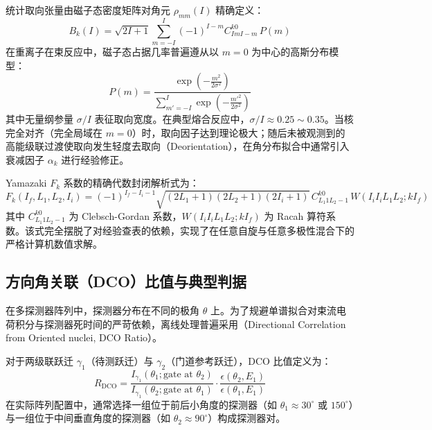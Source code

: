 统计取向张量由磁子态密度矩阵对角元 $\rho_{mm}(I)$ 精确定义：
\begin{equation}
    B_k(I) = \sqrt{2I+1} \sum_{m=-I}^I (-1)^{I-m} C_{I m I -m}^{k 0} \, P(m)
    \label{eq:orientation_tensor}
\end{equation}
在重离子在束反应中，磁子态占据几率普遍遵从以 $m=0$ 为中心的高斯分布模型：
\begin{equation}
    P(m) = \frac{\exp\left( -\frac{m^2}{2\sigma^2} \right)}{\sum_{m'=-I}^I \exp\left( -\frac{m'^2}{2\sigma^2} \right)}
    \label{eq:gaussian_substates}
\end{equation}
其中无量纲参量 $\sigma/I$ 表征取向宽度。在典型熔合反应中，$\sigma/I \approx 0.25 \sim 0.35$。当核完全对齐（完全局域在 $m=0$）时，取向因子达到理论极大；随后未被观测到的高能级联过渡使取向发生轻度去取向（Deorientation），在角分布拟合中通常引入衰减因子 $\alpha_k$ 进行经验修正。

Yamazaki $F_k$ 系数的精确代数封闭解析式为：
\begin{equation}
    F_k(I_f, L_1, L_2, I_i) = (-1)^{I_f - I_i - 1} \sqrt{(2L_1+1)(2L_2+1)(2I_i+1)} \, C_{L_1 1 L_2 -1}^{k 0} \, W(I_i I_i L_1 L_2; k I_f)
    \label{eq:yamazaki_formula}
\end{equation}
其中 $C_{L_1 1 L_2 -1}^{k 0}$ 为 Clebsch-Gordan 系数，$W(I_i I_i L_1 L_2; k I_f)$ 为 Racah 算符系数。该式完全摆脱了对经验查表的依赖，实现了在任意自旋与任意多极性混合下的严格计算机数值求解。

\subsection{方向角关联（DCO）比值与典型判据}

在多探测器阵列中，探测器分布在不同的极角 $\theta$ 上。为了规避单谱拟合对束流电荷积分与探测器死时间的严苛依赖，离线处理普遍采用（Directional Correlation from Oriented nuclei, DCO Ratio）。

对于两级联跃迁 $\gamma_1$（待测跃迁）与 $\gamma_2$（门道参考跃迁），DCO 比值定义为：
\begin{equation}
    R_{\text{DCO}} = \frac{I_{\gamma_1}(\theta_1; \text{gate at } \theta_2)}{I_{\gamma_1}(\theta_2; \text{gate at } \theta_1)} \cdot \frac{\epsilon(\theta_2, E_1)}{\epsilon(\theta_1, E_1)}
    \label{eq:dco_ratio}
\end{equation}
在实际阵列配置中，通常选择一组位于前后小角度的探测器（如 $\theta_1 \approx 30^\circ$ 或 $150^\circ$）与一组位于中间垂直角度的探测器（如 $\theta_2 \approx 90^\circ$）构成探测器对。

